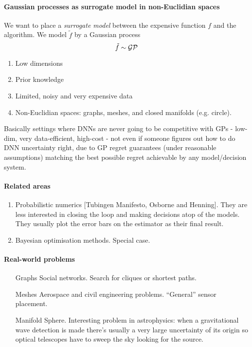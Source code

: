 \paragraph{Gaussian processes as surrogate model in non-Euclidian spaces}
We want to place a \emph{surrogate model} between the expensive function $f$ and the algorithm. We model $\tilde{f}$ by a Gaussian process
\begin{equation}
    \tilde{f} \sim \mathcal{GP}
\end{equation}

\begin{enumerate}
    \item Low dimensions
    \item Prior knowledge
    \item Limited, noisy and very expensive data
    \item Non-Euclidian spaces: graphs, meshes, and closed manifolds (e.g. circle).
\end{enumerate}

Basically settings where DNNs are never going to be competitive with GPs - low-dim, very data-efficient, high-cost - not even if someone figures out how to do DNN uncertainty right, due to GP regret guarantees (under reasonable assumptions) matching the best possible regret achievable by any model/decision system.

\paragraph{Related areas}
\begin{enumerate}
    \item Probabilistic numerics [Tubingen Manifesto, Osborne and Henning]. They are less interested in closing the loop and making decisions atop of the models. They usually plot the error bars on the estimator as their final result.
    \item Bayesian optimisation methods. Special case.
\end{enumerate}

\paragraph{Real-world problems}
\begin{itemize}
    \item[Graphs] Social networks. Search for cliques or shortest paths.
    \item[Meshes] Aerospace and civil engineering problems. ``General'' sensor placement.
    \item[Manifold] Sphere. Interesting problem in astrophysics: when a gravitational wave detection is made there's usually a very large uncertainty of its origin so optical telescopes have to sweep the sky looking for the source.
\end{itemize}

